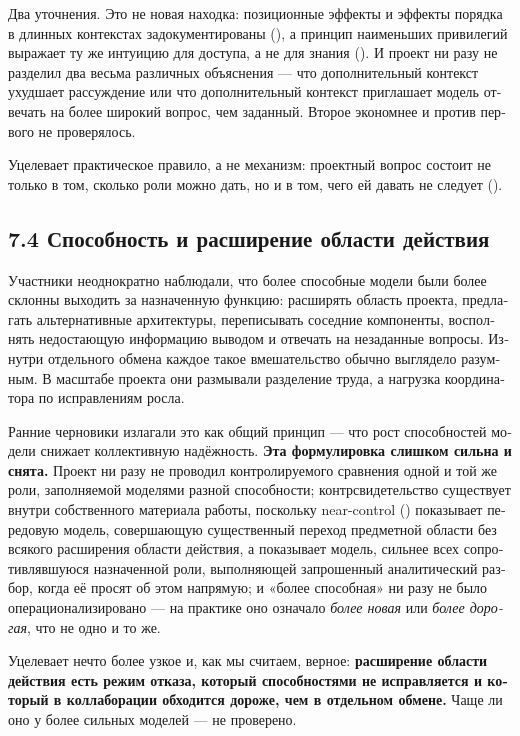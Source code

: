 \begin{russian}
Два уточнения. Это не новая находка: позиционные эффекты и эффекты порядка в длинных контекстах задокументированы (), а принцип наименьших привилегий выражает ту же интуицию для доступа, а не для знания (). И проект ни разу не разделил два весьма различных объяснения — что дополнительный контекст ухудшает рассуждение или что дополнительный контекст приглашает модель отвечать на более широкий вопрос, чем заданный. Второе экономнее и против первого не проверялось.

Уцелевает практическое правило, а не механизм: проектный вопрос состоит не только в том, сколько роли можно дать, но и в том, чего ей давать не следует ().


\subsection*{7.4 Способность и расширение области действия}
\label{sec:ru:7.4}

Участники неоднократно наблюдали, что более способные модели были более склонны выходить за назначенную функцию: расширять область проекта, предлагать альтернативные архитектуры, переписывать соседние компоненты, восполнять недостающую информацию выводом и отвечать на незаданные вопросы. Изнутри отдельного обмена каждое такое вмешательство обычно выглядело разумным. В масштабе проекта они размывали разделение труда, а нагрузка координатора по исправлениям росла.

Ранние черновики излагали это как общий принцип — что рост способностей модели снижает коллективную надёжность. \textbf{Эта формулировка слишком сильна и снята.} Проект ни разу не проводил контролируемого сравнения одной и той же роли, заполняемой моделями разной способности; контрсвидетельство существует внутри собственного материала работы, поскольку near-control () показывает передовую модель, совершающую существенный переход предметной области без всякого расширения области действия, а  показывает модель, сильнее всех сопротивлявшуюся назначенной роли, выполняющей запрошенный аналитический разбор, когда её просят об этом напрямую; и «более способная» ни разу не было операционализировано — на практике оно означало \emph{более новая} или \emph{более дорогая}, что не одно и то же.

Уцелевает нечто более узкое и, как мы считаем, верное: \textbf{расширение области действия есть режим отказа, который способностями не исправляется и который в коллаборации обходится дороже, чем в отдельном обмене.} Чаще ли оно у более сильных моделей — не проверено.



\end{russian}
